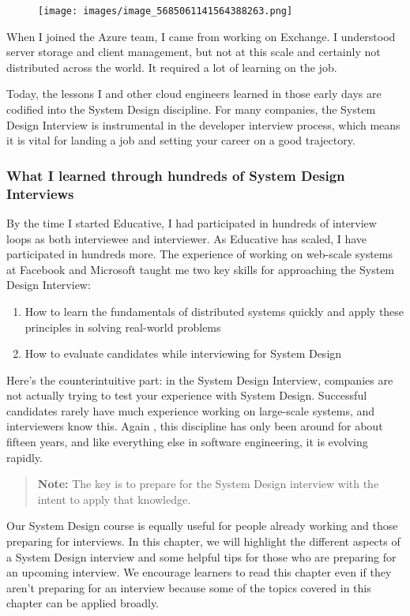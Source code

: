 \begin{figure}[htbp]
 \centering
 \texttt{[image: images/image\_5685061141564388263.png]}
 
\end{figure}

When I joined the Azure team, I came from working on Exchange. I understood server storage and client management, but not at this scale and certainly not distributed across the world. It required a lot of learning on the job.

Today, the lessons I and other cloud engineers learned in those early days are codified into the System Design discipline. For many companies, the System Design Interview is instrumental in the developer interview process, which means it is vital for landing a job and setting your career on a good trajectory.

\subsubsection{What I learned through hundreds of System Design Interviews}\label{5Ai-AQby7BVCxBidhX3m3}

By the time I started Educative, I had participated in hundreds of interview loops as both interviewee and interviewer. As Educative has scaled, I have participated in hundreds more. The experience of working on web-scale systems at Facebook and Microsoft taught me two key skills for approaching the System Design Interview:

\begin{enumerate}
\item
{}\label{Ggzh5pTw39SD5OD34_J0H}
How to learn the fundamentals of distributed systems quickly and apply these principles in solving real-world problems
\item
{}\label{uaDMkBB3F04VJuTLg7hyL}
How to evaluate candidates while interviewing for System Design
\end{enumerate}

Here's the counterintuitive part: in the System Design Interview, companies are not actually trying to test your experience with System Design. Successful candidates rarely have much experience working on large-scale systems, and interviewers know this. Again , this discipline has only been around for about fifteen years, and like everything else in software engineering, it is evolving rapidly.
\begin{quote}
\textbf{Note:} The key is to prepare for the System Design interview with the intent to apply that knowledge.
\end{quote}
Our System Design course is equally useful for people already working and those preparing for interviews. In this chapter, we will highlight the different aspects of a System Design interview and some helpful tips for those who are preparing for an upcoming interview. We encourage learners to read this chapter even if they aren't preparing for an interview because some of the topics covered in this chapter can be applied broadly.

